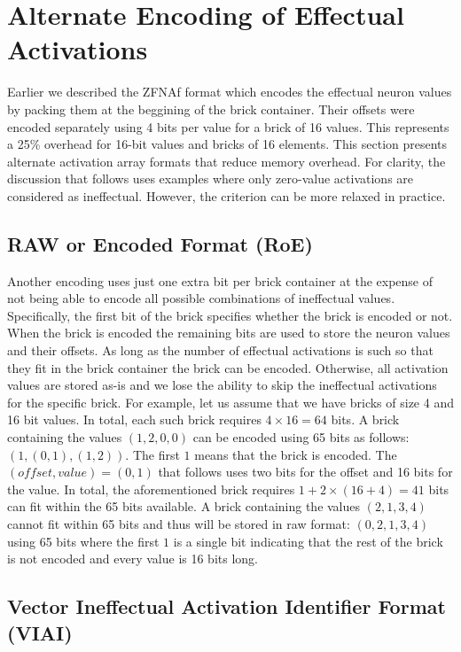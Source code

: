 \section{Alternate Encoding of Effectual Activations} 
Earlier we described the ZFNAf format which encodes the effectual neuron values by packing them at the beggining of the brick container. Their offsets were encoded separately using 4 bits per value for a brick of 16 values. This represents a 25\% overhead for 16-bit values and bricks of 16 elements. This section presents alternate activation array formats that reduce memory overhead. For clarity, the discussion that follows uses examples where only zero-value activations are considered as ineffectual. However, the criterion can be more relaxed in practice.

\subsection{RAW or Encoded Format (RoE)}
 Another encoding uses just one extra bit per brick container at the expense of not being able to encode all possible combinations of ineffectual values. Specifically, the first bit of the brick specifies whether the brick is encoded or not. When the brick is encoded the remaining bits are used to store the neuron values and their offsets. As long as the number of effectual activations is such so that they fit in the brick container the brick can be encoded. Otherwise, all activation values are stored as-is and we lose the ability to skip the ineffectual activations for the specific brick. For example, let us assume that we have bricks of size 4 and 16 bit values. In total, each such brick requires $4\times 16=64$ bits. A brick containing the values $(1,2,0,0)$ can be encoded using 65 bits as follows: $(1,(0,1),(1,2))$. The first $1$ means that the brick is encoded. The $(offset,value)=(0,1)$ that follows uses two bits for the offset and 16 bits for the value. In total, the aforementioned brick requires $1+2\times(16+4)=41$ bits can fit within the 65 bits available. A brick containing the values $(2,1,3,4)$ cannot fit within 65 bits and thus will be stored in raw format: $(0,2,1,3,4)$ using 65 bits where the first $1$ is a single bit indicating that the rest of the brick is not encoded and every value is 16 bits long.

\subsection{Vector Ineffectual Activation Identifier Format (VIAI)}

